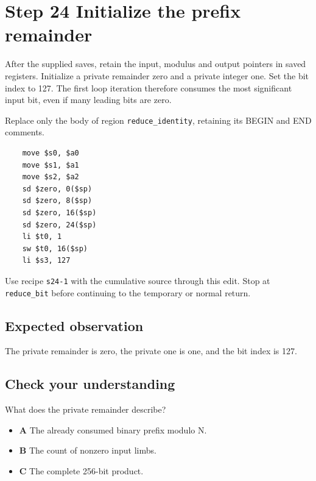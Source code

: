 \section{Step 24 Initialize the prefix remainder}\label{rsa-s24}

After the supplied saves, retain the input, modulus and output pointers in saved registers. Initialize a private remainder zero and a private integer one. Set the bit index to 127. The first loop iteration therefore consumes the most significant input bit, even if many leading bits are zero.

Replace only the body of region \texttt{reduce\_identity}, retaining its BEGIN and END comments.

\begin{verbatim}
    move $s0, $a0
    move $s1, $a1
    move $s2, $a2
    sd $zero, 0($sp)
    sd $zero, 8($sp)
    sd $zero, 16($sp)
    sd $zero, 24($sp)
    li $t0, 1
    sw $t0, 16($sp)
    li $s3, 127
\end{verbatim}

Use recipe \texttt{s24-1} with the cumulative source through this edit. Stop at \texttt{reduce\_bit} before continuing to the temporary or normal return.

\subsection{Expected observation}
The private remainder is zero, the private one is one, and the bit index is 127.

\subsection{Check your understanding}
What does the private remainder describe?

\begin{itemize}
  \item \textbf{A} The already consumed binary prefix modulo N.
  \item \textbf{B} The count of nonzero input limbs.
  \item \textbf{C} The complete 256-bit product.
\end{itemize}
